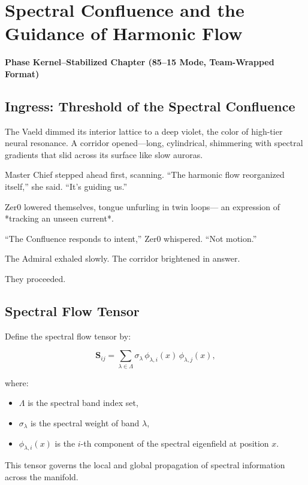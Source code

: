 
\chapter{Spectral Confluence and the Guidance of Harmonic Flow}
\textbf{Phase Kernel–Stabilized Chapter (85--15 Mode, Team-Wrapped Format)}

\section*{Ingress: Threshold of the Spectral Confluence}

The Vaeld dimmed its interior lattice to a deep violet, the color of high-tier neural resonance.
A corridor opened—long, cylindrical, shimmering with spectral gradients that slid across its surface like slow auroras.

Master Chief stepped ahead first, scanning.
“The harmonic flow reorganized itself,” she said. “It’s guiding us.”

Zer0 lowered themselves, tongue unfurling in twin loops—
an expression of *tracking an unseen current*.

“The Confluence responds to intent,” Zer0 whispered.
“Not motion.”

The Admiral exhaled slowly.
The corridor brightened in answer.

They proceeded.

\section{Spectral Flow Tensor}

Define the spectral flow tensor by:

\[
\mathbf{S}_{ij} = \sum_{\lambda \in \Lambda}
    \sigma_\lambda \,
    \phi_{\lambda,i}(x)\,
    \phi_{\lambda,j}(x),
\]

where:

\begin{itemize}
\item $\Lambda$ is the spectral band index set,
\item $\sigma_\lambda$ is the spectral weight of band $\lambda$,
\item $\phi_{\lambda,i}(x)$ is the $i$-th component of the spectral eigenfield at position $x$.
\end{itemize}

This tensor governs the local and global propagation of spectral information across the manifold.

